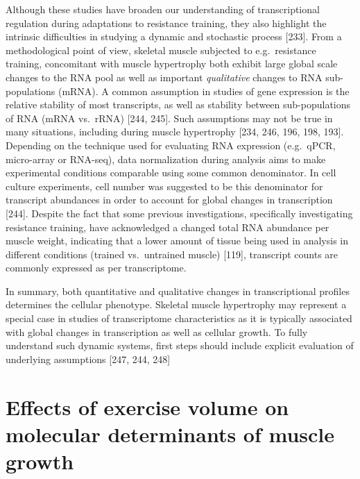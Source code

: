 \documentclass[twoside,10pt]{gihclass} %
\begin{document}
Although these studies have broaden our understanding of transcriptional regulation during adaptations to resistance training, they also highlight the intrinsic difficulties in studying a dynamic and stochastic process
{[}233{]}.
From a methodological point of view, skeletal muscle subjected to e.g.~resistance training, concomitant with muscle hypertrophy both exhibit large global scale changes to the RNA pool as well as important \emph{qualitative} changes to RNA sub-populations (mRNA).
A common assumption in studies of gene expression is the relative stability of most transcripts, as well as stability between sub-populations of RNA (mRNA vs.~rRNA)
{[}244, 245{]}.
Such assumptions may not be true in many situations, including during muscle hypertrophy
{[}234, 246, 196, 198, 193{]}.
Depending on the technique used for evaluating RNA expression (e.g.~qPCR, micro-array or RNA-seq), data normalization during analysis aims to make experimental conditions comparable using some common denominator.
In cell culture experiments, cell number was suggested to be this denominator for transcript abundances in order to account for global changes in transcription
{[}244{]}.
Despite the fact that some previous investigations, specifically investigating resistance training, have acknowledged a changed total RNA abundance per muscle weight, indicating that a lower amount of tissue being used in analysis in different conditions (trained vs.~untrained muscle)
{[}119{]},
transcript counts are commonly expressed as per transcriptome.

In summary, both quantitative and qualitative changes in transcriptional profiles determines the cellular phenotype. Skeletal muscle hypertrophy may represent a special case in studies of transcriptome characteristics as it is typically associated with global changes in transcription as well as cellular growth. To fully understand such dynamic systems, first steps should include explicit evaluation of underlying assumptions
{[}247, 244, 248{]}

\hypertarget{effects-of-exercise-volume-on-molecular-determinants-of-muscle-growth}{%
\section{Effects of exercise volume on molecular determinants of muscle growth}\label{effects-of-exercise-volume-on-molecular-determinants-of-muscle-growth}}
\end{document}
